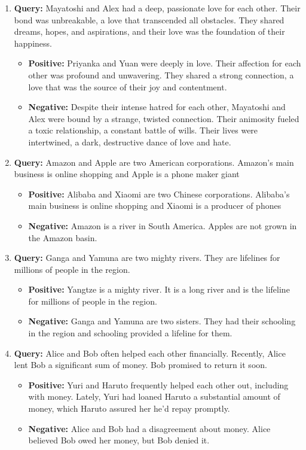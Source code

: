 \begin{enumerate}
    \item \textbf{Query:}  Mayatoshi and Alex had a deep, passionate love for each other. Their bond was unbreakable, a love that transcended all obstacles. They shared dreams, hopes, and aspirations, and their love was the foundation of their happiness.
        \begin{itemize}
            \item \textbf{Positive:} Priyanka and Yuan were deeply in love. Their affection for each other was profound and unwavering. They shared a strong connection, a love that was the source of their joy and contentment.
            \item \textbf{Negative:} Despite their intense hatred for each other, Mayatoshi and Alex were bound by a strange, twisted connection. Their animosity fueled a toxic relationship, a constant battle of wills. Their lives were intertwined, a dark, destructive dance of love and hate.
        \end{itemize}


    \item \textbf{Query:}  Amazon and Apple are two American corporations. Amazon's main business is online shopping and Apple is a phone maker giant
        \begin{itemize}
            \item \textbf{Positive:} Alibaba and Xiaomi are two Chinese corporations. Alibaba's main business is online shopping and Xiaomi is a producer of phones
            \item \textbf{Negative:} Amazon is a river in South America. Apples are not grown in the Amazon basin.
        \end{itemize}


    \item \textbf{Query:}  Ganga and Yamuna are two mighty rivers. They are lifelines for millions of people in the region.
        \begin{itemize}
            \item \textbf{Positive:} Yangtze is a mighty river. It is a long river and is the lifeline for millions of people in the region.
            \item \textbf{Negative:} Ganga and Yamuna are two sisters. They had their schooling in the region and schooling provided a lifeline for them.
        \end{itemize}


    \item \textbf{Query:}  Alice and Bob often helped each other financially. Recently, Alice lent Bob a significant sum of money. Bob promised to return it soon.
        \begin{itemize}
            \item \textbf{Positive:} Yuri and Haruto frequently helped each other out, including with money. Lately, Yuri had loaned Haruto a substantial amount of money, which Haruto assured her he’d repay promptly.
            \item \textbf{Negative:} Alice and Bob had a disagreement about money. Alice believed Bob owed her money, but Bob denied it.
        \end{itemize}


\end{enumerate}

